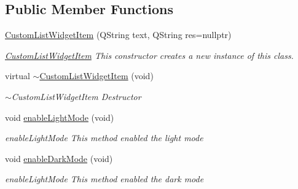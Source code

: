 \subsection*{Public Member Functions}
\begin{DoxyCompactItemize}
\item 
\mbox{\hyperlink{classui_1_1custom_u_i_1_1_custom_list_widget_item_a7da08f342e6eeb0a2a4833c3031a9246}{Custom\+List\+Widget\+Item}} (Q\+String text, Q\+String res=nullptr)
\begin{DoxyCompactList}\small\item\em \mbox{\hyperlink{classui_1_1custom_u_i_1_1_custom_list_widget_item}{Custom\+List\+Widget\+Item}} This constructor creates a new instance of this class. \end{DoxyCompactList}\item 
virtual \mbox{\hyperlink{classui_1_1custom_u_i_1_1_custom_list_widget_item_abe90e419781fb947e684a4dea54568e4}{$\sim$\+Custom\+List\+Widget\+Item}} (void)
\begin{DoxyCompactList}\small\item\em $\sim$\+Custom\+List\+Widget\+Item Destructor \end{DoxyCompactList}\item 
void \mbox{\hyperlink{classui_1_1custom_u_i_1_1_custom_list_widget_item_a71d6b28f6e542c450807f2277ddacdc4}{enable\+Light\+Mode}} (void)
\begin{DoxyCompactList}\small\item\em enable\+Light\+Mode This method enabled the light mode \end{DoxyCompactList}\item 
void \mbox{\hyperlink{classui_1_1custom_u_i_1_1_custom_list_widget_item_a97000c77f8c27f46c8ef2cc0ee824db0}{enable\+Dark\+Mode}} (void)
\begin{DoxyCompactList}\small\item\em enable\+Light\+Mode This method enabled the dark mode \end{DoxyCompactList}\end{DoxyCompactItemize}
